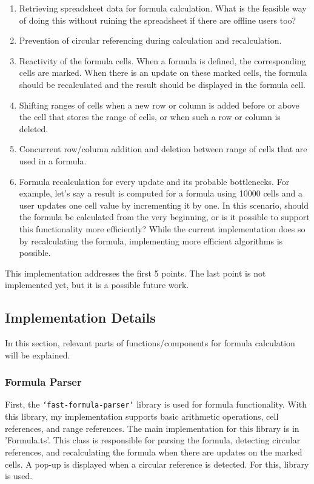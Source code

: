\documentclass{article}
\begin{document}
\begin{enumerate}
    \item Retrieving spreadsheet data for formula calculation. 
    What is the feasible way of doing this without ruining the spreadsheet if there are offline users too?
    \item Prevention of circular referencing during calculation and recalculation.
    \item Reactivity of the formula cells. When a formula is defined, the corresponding cells are marked. 
    When there is an update on these marked cells, the formula should be recalculated and the result should be displayed in the formula cell.
    \item Shifting ranges of cells when a new row or column is added before or above the cell that stores 
    the range of cells, or when such a row or column is deleted. 
    \item Concurrent row/column addition and deletion between range of cells that are used in a formula.
    \item Formula recalculation for every update and its probable bottlenecks. 
    For example, let's say a result is computed for a formula using 10000 cells and 
    a user updates one cell value by incrementing it by one. 
    In this scenario, should the formula be calculated from the very beginning, 
    or is it possible to support this functionality more efficiently? 
    While the current implementation does so by recalculating the formula, 
    implementing more efficient algorithms is possible.
\end{enumerate}

This implementation addresses the first 5 points. The last point is not implemented yet, but it is a possible future work.

\subsection{Implementation Details}

In this section, relevant parts of functions/components for formula calculation will be explained.

\subsubsection{Formula Parser}

First, the \texttt{`fast-formula-parser`} \cite{fastformula} library is used for formula functionality. 
With this library, my implementation supports basic arithmetic operations, cell references, and range references.
The main implementation for this library is in 'Formula.ts'.
This class is responsible for parsing the formula, detecting circular references, and recalculating the formula
when there are updates on the marked cells. A pop-up is displayed when a circular reference is detected. For this,
\cite{sweetalert2} library is used.
\end{document}
